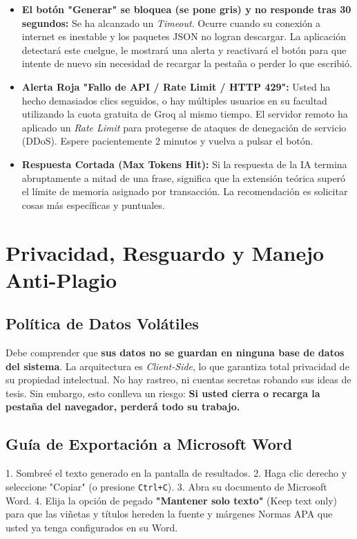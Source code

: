 \documentclass[12pt,a4paper]{article}
\begin{document}
\begin{itemize}
    \item \textbf{El botón "Generar" se bloquea (se pone gris) y no responde tras 30 segundos:} 
    Se ha alcanzado un \textit{Timeout}. Ocurre cuando su conexión a internet es inestable y los paquetes JSON no logran descargar. La aplicación detectará este cuelgue, le mostrará una alerta y reactivará el botón para que intente de nuevo sin necesidad de recargar la pestaña o perder lo que escribió.
    \item \textbf{Alerta Roja "Fallo de API / Rate Limit / HTTP 429":} 
    Usted ha hecho demasiados clics seguidos, o hay múltiples usuarios en su facultad utilizando la cuota gratuita de Groq al mismo tiempo. El servidor remoto ha aplicado un \textit{Rate Limit} para protegerse de ataques de denegación de servicio (DDoS). Espere pacientemente 2 minutos y vuelva a pulsar el botón.
    \item \textbf{Respuesta Cortada (Max Tokens Hit):}
    Si la respuesta de la IA termina abruptamente a mitad de una frase, significa que la extensión teórica superó el límite de memoria asignado por transacción. La recomendación es solicitar cosas más específicas y puntuales.
\end{itemize}

\newpage
\section{Privacidad, Resguardo y Manejo Anti-Plagio}

\subsection{Política de Datos Volátiles}
Debe comprender que \textbf{sus datos no se guardan en ninguna base de datos del sistema}. La arquitectura es \textit{Client-Side}, lo que garantiza total privacidad de su propiedad intelectual. No hay rastreo, ni cuentas secretas robando sus ideas de tesis.
Sin embargo, esto conlleva un riesgo: \textbf{Si usted cierra o recarga la pestaña del navegador, perderá todo su trabajo.}

\subsection{Guía de Exportación a Microsoft Word}
1. Sombreé el texto generado en la pantalla de resultados.
2. Haga clic derecho y seleccione "Copiar" (o presione \texttt{Ctrl+C}). 
3. Abra su documento de Microsoft Word.
4. Elija la opción de pegado \textbf{"Mantener solo texto"} (Keep text only) para que las viñetas y títulos hereden la fuente y márgenes Normas APA que usted ya tenga configurados en su Word.
\end{document}
